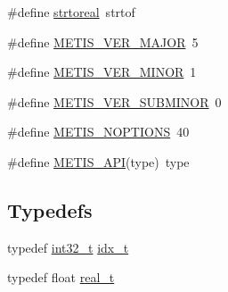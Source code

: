 \begin{DoxyCompactItemize}
\item 
\#define \hyperlink{a00879_a06c5f8b869d94ca0172612a9d102f6cf}{strtoreal}~strtof
\item 
\#define \hyperlink{a00879_a5b0167ec187274a9cf0a89bce6b36738}{M\+E\+T\+I\+S\+\_\+\+V\+E\+R\+\_\+\+M\+A\+J\+OR}~5
\item 
\#define \hyperlink{a00879_aa4bd7d2023e4c66c792060aae10307d9}{M\+E\+T\+I\+S\+\_\+\+V\+E\+R\+\_\+\+M\+I\+N\+OR}~1
\item 
\#define \hyperlink{a00879_a3ce4c253b26a346c2251594b15ad0f4b}{M\+E\+T\+I\+S\+\_\+\+V\+E\+R\+\_\+\+S\+U\+B\+M\+I\+N\+OR}~0
\item 
\#define \hyperlink{a00879_aa33cc5931473a308b9973ce911cfd16a}{M\+E\+T\+I\+S\+\_\+\+N\+O\+P\+T\+I\+O\+NS}~40
\item 
\#define \hyperlink{a00879_aa9e279790a754187de6212e08f098131}{M\+E\+T\+I\+S\+\_\+\+A\+PI}(type)~type
\end{DoxyCompactItemize}
\subsection*{Typedefs}
\begin{DoxyCompactItemize}
\item 
typedef \hyperlink{a00119_a37994e3b11c72957c6f454c6ec96d43d}{int32\+\_\+t} \hyperlink{a00879_aaa5262be3e700770163401acb0150f52}{idx\+\_\+t}
\item 
typedef float \hyperlink{a00879_a1924a4f6907cc3833213aba1f07fcbe9}{real\+\_\+t}
\end{DoxyCompactItemize}
